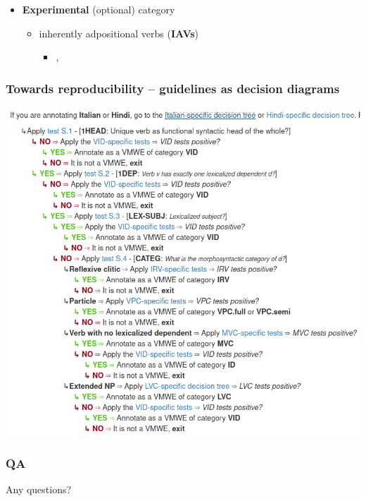 \documentclass[xcolor=dvipsnames]{beamer}
\begin{document}
\begin{frame}
\begin{scriptsize}
\begin{block}{}
\begin{itemize}
\item \textbf{Experimental} (optional) category
   \begin{itemize}
   \item inherently adpositional verbs (\textbf{IAVs})
	\begin{itemize}
	\item[]  , 
	\end{itemize}	
   \end{itemize}
\end{itemize}
\end{block}
\end{scriptsize}

\end{frame}


\begin{frame} 
\frametitle{Towards reproducibility -- guidelines as decision diagrams}

\centering
\includegraphics[scale=0.3]{Images/decision-diagram}


\end{frame}

\begin{frame} 
\frametitle{QA}

\begin{block}{}
Any questions?
\end{block}
\end{frame}
\end{document}
